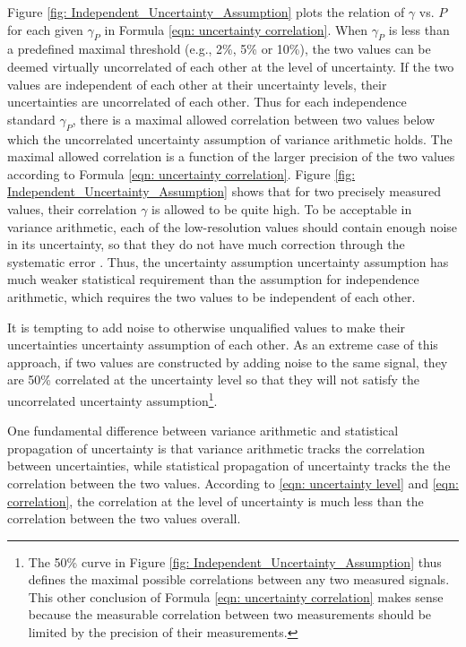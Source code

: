 \documentclass[twoside]{article}
\numberwithin{equation}{section}
\begin{document}
Figure \ref{fig: Independent_Uncertainty_Assumption} plots the relation of $\gamma$ vs. $P$ for each given $\gamma_{P}$ in Formula \eqref{eqn: uncertainty correlation}.  
When $\gamma_{P}$ is less than a predefined maximal threshold (e.g., 2\%, 5\% or 10\%), the two values can be deemed virtually uncorrelated of each other at the level of uncertainty.  
If the two values are independent of each other at their uncertainty levels, their uncertainties are uncorrelated of each other.  
Thus for each independence standard $\gamma_{P}$, there is a maximal allowed correlation between two values below which the uncorrelated uncertainty assumption of variance arithmetic holds.  
The maximal allowed correlation is a function of the larger precision of the two values according to Formula \eqref{eqn: uncertainty correlation}.  
Figure \ref{fig: Independent_Uncertainty_Assumption} shows that for two precisely measured values, their correlation $\gamma$ is allowed to be quite high.  
To be acceptable in variance arithmetic, each of the low-resolution values should contain enough noise in its uncertainty, so that they do not have much correction through the systematic error \cite{Statistical_Methods}\cite{Precisions_Physical_Measurements}.  
Thus, the uncertainty assumption uncertainty assumption has much weaker statistical requirement than the assumption for independence arithmetic, which requires the two values to be independent of each other.

It is tempting to add noise to otherwise unqualified values to make their uncertainties uncertainty assumption of each other.  
As an extreme case of this approach, if two values are constructed by adding noise to the same signal, they are 50\% correlated at the uncertainty level so that they will not satisfy the uncorrelated uncertainty assumption\footnote{The 50\% curve in Figure \ref{fig: Independent_Uncertainty_Assumption} thus defines the maximal possible correlations between any two measured signals. 
This other conclusion of Formula \eqref{eqn: uncertainty correlation} makes sense because the measurable correlation between two measurements should be limited by the precision of their measurements.}.

One fundamental difference between variance arithmetic and statistical propagation of uncertainty is that variance arithmetic tracks the correlation between uncertainties, while statistical propagation of uncertainty tracks the the correlation between the two values. 
According to \eqref{eqn: uncertainty level} and \eqref{eqn: correlation}, the correlation at the level of uncertainty is much less than the correlation between the two values overall.
\end{document}

